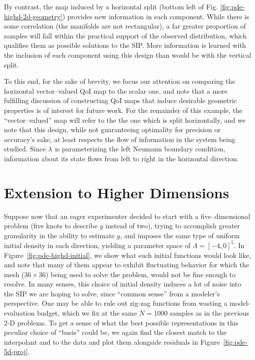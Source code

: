 By contrast, the map induced by a horizontal split (bottom left of Fig. \ref{fig:pde-highd-2d-geometry}) provides new information in each component.
While there is some correlation (the manifolds are not rectangular), a far greater proportion of samples will fall within the practical support of the observed distribution, which qualifies them as possible solutions to the SIP.
More information is learned with the inclusion of each component using this design than would be with the vertical split.

To this end, for the sake of brevity, we focus our attention on comparing the horizontal vector--valued QoI map to the scalar one, and note that a more fulfilling discussion of constructing QoI maps that induce desirable geometric properties is of interest for future work.
For the remainder of this example, the ``vector--valued'' map will refer to the the one which is split horizontally, and we note that this design, while not guaranteeing optimality for precision or accuracy's sake, at least respects the flow of information in the system being studied.
Since $\lambda$ is parameterizing the left Neumann boundary condition, information about its state flows from left to right in the horizontal direction.

\FloatBarrier
\section{Extension to Higher Dimensions}

Suppose now that an eager experimenter decided to start with a five--dimensional problem (five knots to describe $g$ instead of two), trying to accomplish greater granularity in the ability to estimate $g$, and imposes the same type of uniform initial density in each direction, yielding a parameter space of $\Lambda = [-4, 0]^5$.
In Figure~\ref{fig:pde-highd-initial}, we show what such initial functions would look like, and note that many of them appear to exhibit fluctuating behavior for which the mesh ($36\times36$) being used to solve the problem, would not be fine enough to resolve.
In many senses, this choice of initial density induces a lot of noise into the SIP we are hoping to solve, since ``common sense'' from a modeler's perspective.
One may be able to rule out zig-zag functions from wasting a model-evaluation budget, which we fix at the same $N=1000$ samples as in the previous 2-D problems.
To get a sense of what the best possible representations in this peculiar choice of ``basis'' could be, we again find the closest match to the interpolant and to the data and plot them alongside residuals in Figure~\ref{fig:pde-5d-proj}.

